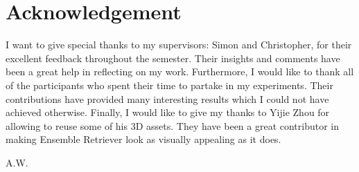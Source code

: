 \chapter*{Acknowledgement}
I want to give special thanks to my supervisors: Simon and Christopher, for their excellent feedback throughout the semester. Their insights and comments have been a great help in reflecting on my work. 
Furthermore, I would like to thank all of the participants who spent their time to partake in my experiments. Their contributions have provided many interesting results which I could not have achieved otherwise. 
Finally, I would like to give my thanks to Yijie Zhou for allowing to reuse some of his 3D assets. They have been a great contributor in making Ensemble Retriever look as visually appealing as it does. 

\begin{flushright}
A.W.\\[1pc]
\end{flushright}